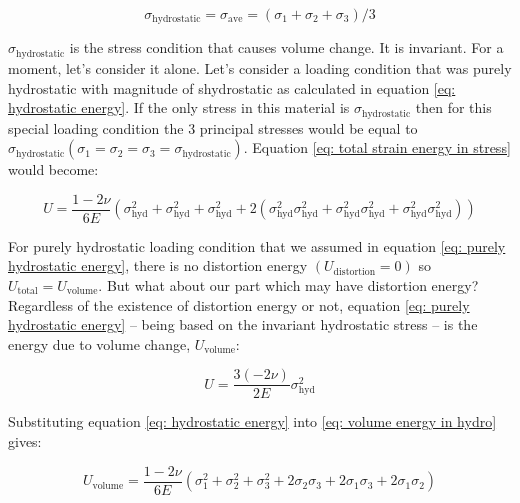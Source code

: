 \begin{equation}\label{eq: hydrostatic energy}
\sigma_\mathrm{hydrostatic} = \sigma_\mathrm{ave} = \left(\sigma_1 + \sigma_2 + \sigma_3 \right) / 3
\end{equation}

$ \sigma_\mathrm{hydrostatic} $ is the stress condition that causes volume change. It is invariant. For a moment, let’s consider it alone. Let’s consider a loading condition that was purely hydrostatic with magnitude of shydrostatic as calculated in equation \ref{eq: hydrostatic energy}. If the only stress in this material is $ \sigma_\mathrm{hydrostatic} $ then for this special loading condition the 3 principal stresses would be equal to $ \sigma_\mathrm{hydrostatic} (\sigma_1 = \sigma_2 = \sigma_3 = \sigma_\mathrm{hydrostatic} ) $. Equation \ref{eq: total strain energy in stress} would become:

\begin{equation}\label{eq: purely hydrostatic energy}
	U = \frac{1-2\nu}{6E} \left( \sigma_\mathrm{hyd}^2 + \sigma_\mathrm{hyd}^2 + \sigma_\mathrm{hyd}^2 + 2\left(\sigma_\mathrm{hyd}^2\sigma_\mathrm{hyd}^2+\sigma_\mathrm{hyd}^2\sigma_\mathrm{hyd}^2+\sigma_\mathrm{hyd}^2\sigma_\mathrm{hyd}^2\right)\right)
\end{equation}

For purely hydrostatic loading condition that we assumed in equation \ref{eq: purely hydrostatic energy}, there is no distortion energy $ (U_\mathrm{distortion} = 0) $ so $ U_\mathrm{total} = U_\mathrm{volume} $. But what about our part which may have distortion energy? Regardless of the existence of distortion energy or not, equation \ref{eq: purely hydrostatic energy} – being based on the invariant hydrostatic stress – is the energy due to volume change, $ U_\mathrm{volume} $:

\begin{equation}\label{eq: volume energy in hydro}
	U = \frac{3(-2\nu)}{2E}\sigma_\mathrm{hyd}^2
\end{equation}

Substituting equation \ref{eq: hydrostatic energy} into \ref{eq: volume energy in hydro} gives:

\begin{equation}\label{eq: volume energy in stress}
U_\mathrm{volume} = \frac{1-2\nu}{6E} \left(\sigma_1^2 + \sigma_2^2 + \sigma_3^2 +2\sigma_2\sigma_3 + 2\sigma_1\sigma_3 + 2\sigma_1\sigma_2 \right)
\end{equation}

